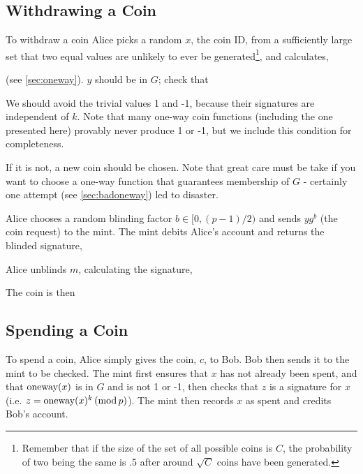 \documentclass[a4paper,titlepage]{article}
\begin{document}

\subsection{Withdrawing a Coin}

To withdraw a coin Alice picks a random $x$, the coin ID, from a
sufficiently large set that two equal values are unlikely to ever be
generated\footnote{Remember that if the size of the set of all
possible coins is $C$, the probability of two being the same is .5
after around $\sqrt{C}$ coins have been generated.}, and calculates,


(see \ref{sec:oneway}). $y$ should be in $G$; check that


We should avoid the trivial values 1 and -1, because their signatures
are independent of $k$. Note that many one-way coin functions
(including the one presented here) provably never produce 1 or -1, but
we include this condition for completeness.


If it is not, a new coin should be chosen. Note that great care must
be take if you want to choose a one-way function that guarantees
membership of $G$ - certainly one attempt (see \ref{sec:badoneway})
led to disaster.

Alice chooses a random blinding factor $b \in [0,(p-1)/2)$ and sends
$y g^b$ (the coin request) to the mint. The mint debits Alice's
account and returns the blinded signature,


Alice unblinds $m$, calculating the signature,


The coin is then


\subsection{Spending a Coin}

To spend a coin, Alice simply gives the coin, $c$, to Bob. Bob then
sends it to the mint to be checked. The mint first ensures that $x$
has not already been spent, and that $\textrm{oneway}(x)$ is in $G$ and is not
1 or -1, then checks that $z$ is a signature for $x$
(i.e. $z=\textrm{oneway}(x)^k \,(\textrm{mod}\,p)$). The mint then records $x$ as spent and
credits Bob's account.
\end{document}
